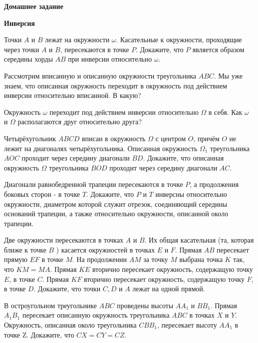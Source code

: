 \centerline{\bf \Huge Домашнее задание}
\centerline{\bf \Huge Инверсия}

\begin{flushright}
        \scriptsize{}
\end{flushright}

Точки $A$ и $B$ лежат на окружности $\omega$. Касательные к окружности, проходящие через точки $A$ и $B$, пересекаются в точке $P$. Докажите, что $P$ является образом середины хорды $A B$ при инверсии относительно $\omega$.

Рассмотрим вписанную и описанную окружности треугольника $A B C$. Мы уже знаем, что описанная окружность переходит в окружность под действием инверсии относительно вписанной. В какую?

Окружность $\omega$ переходит под действием инверсии относительно $\Omega$ в себя. Как $\omega$ и $\Omega$ располагаются друг относительно друга?

Четырёхугольник $A B C D$ вписан в окружность $\Omega$ с центром $O$, причём $O$ не лежит на диагоналях четырёхугольника. Описанная окружность $\Omega_1$ треугольника $A O C$ проходит через середину диагонали $B D$. Докажите, что описанная окружность $\Omega$ треугольника $B O D$ проходит через середину диагонали $A C$.

Диагонали равнобедренной трапеции пересекаются в точке $P$, а продолжения боковых сторон - в точке $T$. Докажите, что $P$ и $T$ инверсны относительно окружности, диаметром которой служит отрезок, соединяющий середины оснований трапеции, а также относительно окружности, описанной около трапеции.

Две окружности пересекаются в точках $A$ и $B$. Их общая касательная (та, которая ближе к точке $B$ ) касается окружностей в точках $E$ и $F$. Прямая $A B$ пересекает прямую $E F$ в точке $M$. На продолжении $A M$ за точку $M$ выбрана точка $K$ так, что $K M=M A$. Прямая $K E$ вторично пересекает окружность, содержащую точку $E$, в точке $C$. Прямая $K F$ вторично пересекает окружность, содержащую точку $F$, в точке $D$. Докажите, что точки $C, D$ и $A$ лежат на одной прямой.

В остроугольном треугольнике $A B C$ проведены высоты $A A_1$ и $B B_1$. Прямая $A_1 B_1$ пересекает описанную окружность треугольника $A B C$ в точках $X$ и $Y$. Окружность, описанная около треугольника $C B B_1$, пересекает высоту $A A_1$ в точке Z. Докажите, что $C X=C Y=C Z$.